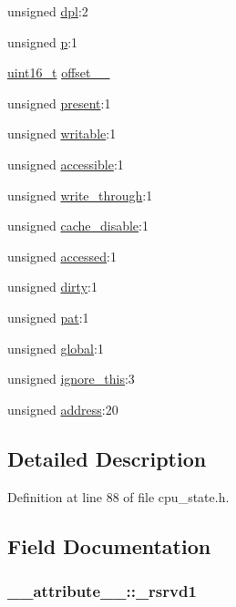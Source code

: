 \begin{DoxyCompactItemize}
unsigned \hyperlink{struct____attribute_____ae146dc9cb9997c03d09dfab13c32e710}{dpl}\-:2
\item 
unsigned \hyperlink{struct____attribute_____a2021bc70d7ad9c31d8feb1177892aa23}{p}\-:1
\item 
\hyperlink{types_8h_a273cf69d639a59973b6019625df33e30}{uint16\-\_\-t} \hyperlink{struct____attribute_____a0802af6af010d868e2f962ac4ec60d27}{offset\-\_\-\_}
\item 
unsigned \hyperlink{struct____attribute_____a51892c7fc8fb14709cd2e83770375cab}{present}\-:1
\item 
unsigned \hyperlink{struct____attribute_____aa54f6106e9d41e64e8adc771d2dacd31}{writable}\-:1
\item 
unsigned \hyperlink{struct____attribute_____ac16120b81080d11c5a6004609ac55d78}{accessible}\-:1
\item 
unsigned \hyperlink{struct____attribute_____a0155c4462a7b1669120975fbe985a5dc}{write\-\_\-through}\-:1
\item 
unsigned \hyperlink{struct____attribute_____a6f6be37e97343c365cecf5bbafe89119}{cache\-\_\-disable}\-:1
\item 
unsigned \hyperlink{struct____attribute_____a43efc2e4e993f4b1d45366309f00d528}{accessed}\-:1
\item 
unsigned \hyperlink{struct____attribute_____a684719632df533b51256f379d081cf72}{dirty}\-:1
\item 
unsigned \hyperlink{struct____attribute_____a88f7cfc63b53846d4c67a3b0797134ef}{pat}\-:1
\item 
unsigned \hyperlink{struct____attribute_____a64b47dff3d08e4138ce9523711ef1545}{global}\-:1
\item 
unsigned \hyperlink{struct____attribute_____a097e9473ec96eac6c0e467f6b5f21cca}{ignore\-\_\-this}\-:3
\item 
unsigned \hyperlink{struct____attribute_____a85e46dba0f375cb39265b72e5ce1c61d}{address}\-:20
\end{DoxyCompactItemize}


\subsection{\-Detailed \-Description}


\-Definition at line 88 of file cpu\-\_\-state.\-h.



\subsection{\-Field \-Documentation}
\hypertarget{struct____attribute_____a061cb57abbaeda5ba8498128813742a5}{
\subsubsection[{\-\_\-rsrvd1}]{ {\bf \-\_\-\-\_\-attribute\-\_\-\-\_\-\-::\-\_\-rsrvd1}}}\label{struct____attribute_____a061cb57abbaeda5ba8498128813742a5}


